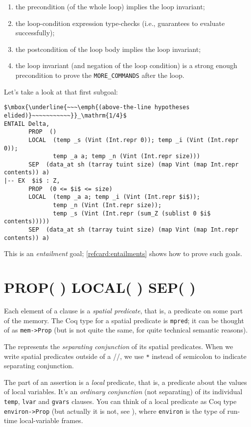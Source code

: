 \documentclass[12pt,fleqn,openany,oneside,showtrims]{memoir}
\begin{document}
\vspace{-\topsep}
\begin{enumerate}
\item the precondition (of the whole loop) implies the loop invariant;
\item the loop-condition expression type-checks (i.e., guarantees to evaluate successfully);
\item the postcondition of the loop body implies the loop invariant;
\item the loop invariant (and negation of the loop condition) is a
  strong enough
  precondition to prove the \lstinline{MORE_COMMANDS} after the loop.
\end{enumerate}
Let's take a look at that first subgoal:
\begin{lstlisting}
$\mbox{\underline{~~~\emph{(above-the-line hypotheses elided)}~~~~~~~~~~~}}_\mathrm{1/4}$
ENTAIL Delta,
       PROP  ()
       LOCAL  (temp _s (Vint (Int.repr 0)); temp _i (Vint (Int.repr 0));
              temp _a a; temp _n (Vint (Int.repr size)))
       SEP  (data_at sh (tarray tuint size) (map Vint (map Int.repr contents)) a)
|-- EX  $i$ : Z,
       PROP  (0 <= $i$ <= size)
       LOCAL  (temp _a a; temp _i (Vint (Int.repr $i$));
              temp _n (Vint (Int.repr size));
              temp _s (Vint (Int.repr (sum_Z (sublist 0 $i$ contents)))))
       SEP  (data_at sh (tarray tuint size) (map Vint (map Int.repr contents)) a)
\end{lstlisting}
This is an \emph{entailment} goal; \autoref{refcard:entailments}
shows how to prove such goals.

\chapter{\upshape PROP( ) LOCAL( ) SEP( )}
\label{refcard:prop-local-sep}
\label{refcard:predicates}

Each element of a \SEP{} clause is a
\emph{spatial predicate}, that is,
a predicate on some part of the memory.
The Coq type for a spatial predicate
is \lstinline{mpred}; it
can be thought of as \lstinline{mem->Prop} (but is not quite
the same, for quite technical semantic reasons).

The \SEP{} represents the \emph{separating conjunction}
of its spatial predicates.
When we write spatial predicates outside of a
\PROP/\LOCAL/\SEP{}, we use \lstinline{*} instead of
semicolon to indicate separating conjunction.

The \LOCAL{} part of an assertion is a
\emph{local} predicate, that is, a predicate about the values
of local variables.  It's an \emph{ordinary conjunction}
(not separating) of its individual \lstinline{temp}, \lstinline{lvar} and \lstinline{gvars} clauses.
You can think of a local predicate as Coq type
\lstinline{environ->Prop} (but actually it is not, see ), where \lstinline{environ} is
the type of run-time local-variable frames.
\end{document}
